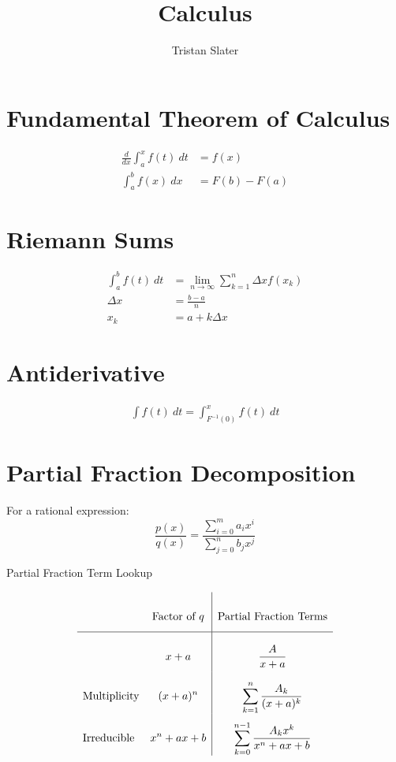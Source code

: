 \documentclass{article}
\title{Calculus}
\author{Tristan Slater}
\begin{document}
    \maketitle

    \section{Fundamental Theorem of Calculus}

    \begin{align}
        \frac{d}{dx}{\int_a^x{f(t)\ dt}} &= f(x) \\
        \int_a^b{f(x)\ dx} &= F(b) - F(a)
    \end{align}

    \section{Riemann Sums}

    \begin{align}
        \int_a^b{f(t)\ dt} &= \lim_{n \to \infty}{\sum_{k = 1}^n{\Delta x f(x_k)}} \\
        \Delta x &= \frac{b - a}{n} \\
        x_k &= a + k\Delta x
    \end{align}
    
    \section{Antiderivative}
    
    \begin{align}
        \int{f(t)\ dt} = \int_{F^{-1}(0)}^x{f(t)\ dt}
    \end{align}
    
    \section{Partial Fraction Decomposition}

    For a rational expression: $$\frac{p(x)}{q(x)} = \frac{\sum_{i = 0}^m{a_ix^i}}{\sum_{j = 0}^n{b_jx^j}}$$

    \begin{table}[h]
        \caption{Partial Fraction Term Lookup}
        $$\def\arraystretch{3}
        \begin{array}{>$l<$>{\displaystyle}c|>{\displaystyle}c}
            & \text{Factor of }q & \text{Partial Fraction Terms} \\
            \hline
            & x + a & \frac{A}{x + a} \\
            Multiplicity & (x + a)^n & \sum_{k = 1}^n{\frac{A_k}{(x + a)^k}} \\
            Irreducible & x^n + ax + b & \sum_{k = 0}^{n - 1}{\frac{A_kx^k}{x^n + ax + b}}
        \end{array}$$
    \end{table}
\end{document}
